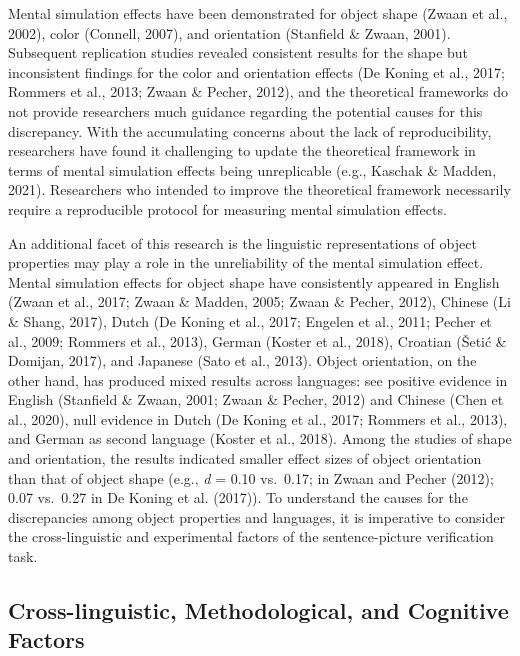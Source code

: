 \documentclass[
  man,floatsintext]{apa7}
\begin{document}
Mental simulation effects have been demonstrated for object shape (Zwaan et al., 2002), color (Connell, 2007), and orientation (Stanfield \& Zwaan, 2001). Subsequent replication studies revealed consistent results for the shape but inconsistent findings for the color and orientation effects (De Koning et al., 2017; Rommers et al., 2013; Zwaan \& Pecher, 2012), and the theoretical frameworks do not provide researchers much guidance regarding the potential causes for this discrepancy. With the accumulating concerns about the lack of reproducibility, researchers have found it challenging to update the theoretical framework in terms of mental simulation effects being unreplicable (e.g., Kaschak \& Madden, 2021). Researchers who intended to improve the theoretical framework necessarily require a reproducible protocol for measuring mental simulation effects.

An additional facet of this research is the linguistic representations of object properties may play a role in the unreliability of the mental simulation effect. Mental simulation effects for object shape have consistently appeared in English (Zwaan et al., 2017; Zwaan \& Madden, 2005; Zwaan \& Pecher, 2012), Chinese (Li \& Shang, 2017), Dutch (De Koning et al., 2017; Engelen et al., 2011; Pecher et al., 2009; Rommers et al., 2013), German (Koster et al., 2018), Croatian (Šetić \& Domijan, 2017), and Japanese (Sato et al., 2013). Object orientation, on the other hand, has produced mixed results across languages: see positive evidence in English (Stanfield \& Zwaan, 2001; Zwaan \& Pecher, 2012) and Chinese (Chen et al., 2020), null evidence in Dutch (De Koning et al., 2017; Rommers et al., 2013), and German as second language (Koster et al., 2018). Among the studies of shape and orientation, the results indicated smaller effect sizes of object orientation than that of object shape (e.g., \emph{d} = 0.10 vs.~0.17; in Zwaan and Pecher (2012); 0.07 vs.~0.27 in De Koning et al. (2017)). To understand the causes for the discrepancies among object properties and languages, it is imperative to consider the cross-linguistic and experimental factors of the sentence-picture verification task.

\hypertarget{cross-linguistic-methodological-and-cognitive-factors}{%
\subsection{Cross-linguistic, Methodological, and Cognitive Factors}\label{cross-linguistic-methodological-and-cognitive-factors}}
\end{document}

